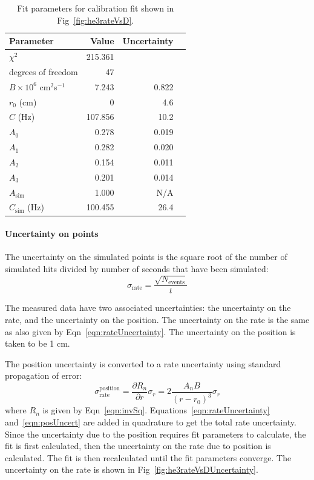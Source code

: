 \begin{table}[htb]
	\centering
	\begin{tabular}{ lrrr }
Parameter		& Value		& Uncertainty	 \\ \hline \hline
	$\chi^2$		& 215.361	& 		\\
	degrees of freedom		& 47		&		\\
	$B\times10^{6}$ cm$^2$s$^{-1}$ 	&	7.243 	& 0.822 	\\	
$	r_{0}$ (cm)	&	0 			& 4.6 	\\	
	$C$ (Hz)	&	107.856				& 10.2 	\\	
$	A_{0}	$	&	0.278				& 0.019	\\	
$	A_{1}	$	&	0.282				& 0.020	\\	
$	A_{2}	$	&	0.154				& 0.011	\\	
$	A_{3}	$	&	0.201				& 0.014	\\	
$	A_{\mathrm{sim}}	$	&	1.000				& N/A	\\	
$	C_{\mathrm{sim}}	$ (Hz)	&	100.455				& 26.4 	\\	\hline

	\end{tabular}
	\caption[Fit parameters for calibration fit shown in Fig~\ref{fig:he3rateVsD}]{Fit parameters for calibration fit shown in Fig~\ref{fig:he3rateVsD}.}
	\label{tab:CalibrationFitPars}
\end{table}

\paragraph{Uncertainty on points}

	The uncertainty on the simulated points is the square root of the number of simulated hits divided by number of seconds that have been simulated:
\begin{equation}
	\sigma_{\mathrm{rate}} = \frac{\sqrt{N_{\mathrm{events}}}}{t}
	\label{eqn:rateUncertainty}
\end{equation}

	The measured data have two associated uncertainties: the uncertainty on the rate, and the uncertainty on the position. The uncertainty on the rate is the same as also given by Eqn~\ref{eqn:rateUncertainty}. The uncertainty on the position is taken to be 1 cm. 

The position uncertainty is converted to a rate uncertainty using standard propagation of error:
\begin{equation}
	\sigma_{\mathrm{rate}}^{\mathrm{position}} = \frac{\partial R_{n}}{\partial r}\sigma_{r}= 2\frac{A_{n}B}{(r-r_0)^3}\sigma_{r}
	\label{eqn:posUncert}
\end{equation}
where $R_{n}$ is given by Eqn~\ref{eqn:invSq}.
Equations~\ref{eqn:rateUncertainty} and~\ref{eqn:posUncert} are added in quadrature to get the total rate uncertainty. Since the uncertainty due to the position requires fit parameters to calculate, the fit is first calculated, then the uncertainty on the rate due to position is calculated. The fit is then recalculated until the fit parameters converge. The uncertainty on the rate is shown in Fig~\ref{fig:he3rateVsDUncertainty}.

